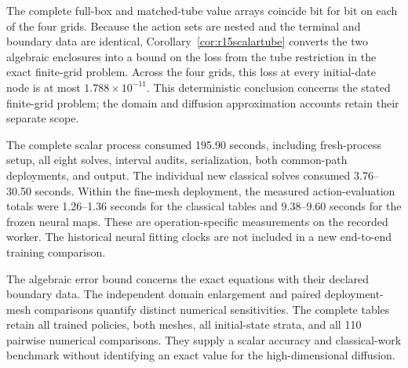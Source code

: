 The complete full-box and matched-tube value arrays coincide bit for bit on each of the four grids. Because the action sets are nested and the terminal and boundary data are identical, Corollary~\ref{cor:r15scalartube} converts the two algebraic enclosures into a bound on the loss from the tube restriction in the exact finite-grid problem. Across the four grids, this loss at every initial-date node is at most $1.788\times10^{-11}$. This deterministic conclusion concerns the stated finite-grid problem; the domain and diffusion approximation accounts retain their separate scope.

The complete scalar process consumed 195.90 seconds, including fresh-process setup, all eight solves, interval audits, serialization, both common-path deployments, and output. The individual new classical solves consumed 3.76--30.50 seconds. Within the fine-mesh deployment, the measured action-evaluation totals were 1.26--1.36 seconds for the classical tables and 9.38--9.60 seconds for the frozen neural maps. These are operation-specific measurements on the recorded worker. The historical neural fitting clocks are not included in a new end-to-end training comparison.

The algebraic error bound concerns the exact equations with their declared boundary data. The independent domain enlargement and paired deployment-mesh comparisons quantify distinct numerical sensitivities. The complete tables retain all trained policies, both meshes, all initial-state strata, and all 110 pairwise numerical comparisons. They supply a scalar accuracy and classical-work benchmark without identifying an exact value for the high-dimensional diffusion.
